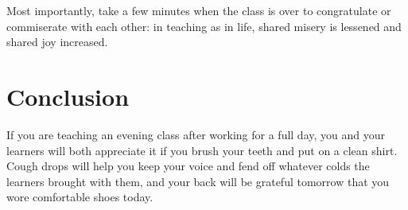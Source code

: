 \documentclass[10pt,letterpaper]{article}
\begin{document}
Most importantly,
take a few minutes when the class is over to congratulate or commiserate with each other:
in teaching as in life,
shared misery is lessened and shared joy increased.

\section*{Conclusion}

If you are teaching an evening class after working for a full day,
you and your learners will both appreciate it if you brush your teeth and put on a clean shirt.
Cough drops will help you keep your voice
and fend off whatever colds the learners brought with them,
and your back will be grateful tomorrow that you wore comfortable shoes today.


\end{document}
